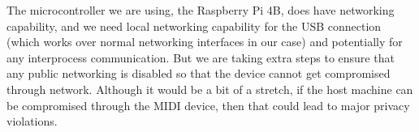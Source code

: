 The microcontroller we are using, the Raspberry Pi 4B, does have networking capability,
and we need local networking capability for the USB connection (which works over normal
networking interfaces in our case) and potentially for any interprocess communication.
But we are taking extra steps to ensure that any public networking is disabled so that the
device cannot get compromised through network. Although it would be a bit of a stretch, if
the host machine can be compromised through the MIDI device, then that could lead to major
privacy violations.